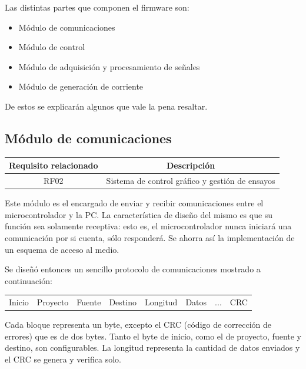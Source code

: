 \documentclass[../et.tex]{subfiles}
\begin{document}
Las distintas partes que componen el firmware son:
  \begin{itemize}
      \item Módulo de comunicaciones
      \item Módulo de control
      \item Módulo de adquisición y procesamiento de señales
      \item Módulo de generación de corriente
  \end{itemize}

De estos se explicarán algunos que vale la pena resaltar.

\subsection{Módulo de comunicaciones}
\begin{table}[H]
  \centering
  \begin{tabular}{|c|c|}
    \hline
    \rowcolor[HTML]{C0C0C0}
    Requisito relacionado   & Descripción                                     \\ \hline
    RF02                    & Sistema de control gráfico y gestión de ensayos \\ \hline
  \end{tabular}
\end{table}

Este módulo es el encargado de enviar y recibir comunicaciones entre el microcontrolador y la PC. La característica de diseño del mismo es que su función sea solamente receptiva: esto es, el microcontrolador nunca iniciará una comunicación por si cuenta, sólo responderá. Se ahorra así la implementación de un esquema de acceso al medio.

Se diseñó entonces un sencillo protocolo de comunicaciones mostrado a continuación:

\begin{table}[!htbp]
    \centering
    \begin{tabular}{c|c|c|c|c|c|c|c}
    Inicio & Proyecto & Fuente & Destino & Longitud & Datos & $...$ & CRC
    \end{tabular}
\end{table}

Cada bloque representa un byte, excepto el CRC (código de corrección de errores) que es de dos bytes. Tanto el byte de inicio, como el de proyecto, fuente y destino, son configurables. La longitud representa la cantidad de datos enviados y el CRC se genera y verifica solo.
\end{document}
